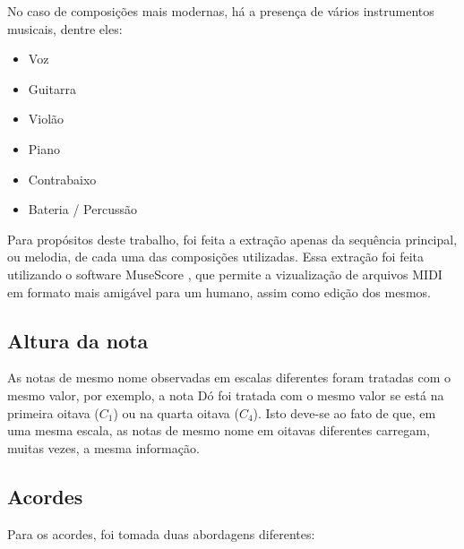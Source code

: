 No caso de composições mais modernas, há a presença de vários instrumentos musicais, dentre eles:

\begin{itemize}
    \item Voz
    \item Guitarra
    \item Violão
    \item Piano
    \item Contrabaixo
    \item Bateria / Percussão
\end{itemize}

Para propósitos deste trabalho, foi feita a extração apenas da sequência principal, ou melodia, de cada uma das composições utilizadas. Essa extração foi feita utilizando o software MuseScore \cite{musescore}, que permite a vizualização de arquivos MIDI em formato mais amigável para um humano, assim como edição dos mesmos.



\subsection{Altura da nota}\label{section:altura_da_nota}

As notas de mesmo nome observadas em escalas diferentes foram tratadas com o mesmo valor, por exemplo, a nota Dó foi tratada com o mesmo valor se está na primeira oitava ($C_1$) ou na quarta oitava ($C_4$). Isto deve-se ao fato de que, em uma mesma escala, as notas de mesmo nome em oitavas diferentes carregam, muitas vezes, a mesma informação.

\subsection{Acordes}

Para os acordes, foi tomada duas abordagens diferentes:

